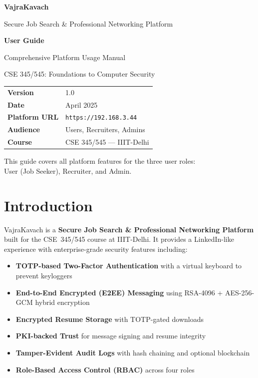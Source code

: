 \documentclass[12pt,a4paper]{article}
\begin{document}
\begin{titlepage}
\centering
\vspace*{2cm}
{\Huge\bfseries\color{primary} VajraKavach\par}
\vspace{0.5cm}
{\Large Secure Job Search \& Professional Networking Platform\par}
\vspace{2cm}
{\LARGE\bfseries User Guide\par}
\vspace{0.3cm}
{\large Comprehensive Platform Usage Manual\par}
\vspace{0.3cm}
{\large CSE 345/545: Foundations to Computer Security\par}
\vspace{2cm}

\begin{tabular}{ll}
\toprule
\textbf{Version} & 1.0 \\
\textbf{Date} & April 2025 \\
\textbf{Platform URL} & \texttt{https://192.168.3.44} \\
\textbf{Audience} & Users, Recruiters, Admins \\
\textbf{Course} & CSE 345/545 --- IIIT-Delhi \\
\bottomrule
\end{tabular}

\vfill
{\small This guide covers all platform features for the three user roles:\\User (Job Seeker), Recruiter, and Admin.}
\end{titlepage}

\newpage
\tableofcontents
\newpage

\section{Introduction}

VajraKavach is a \textbf{Secure Job Search \& Professional Networking Platform} built for the CSE~345/545 course at IIIT-Delhi. It provides a LinkedIn-like experience with enterprise-grade security features including:

\begin{itemize}[leftmargin=*]
  \item \textbf{TOTP-based Two-Factor Authentication} with a virtual keyboard to prevent keyloggers
  \item \textbf{End-to-End Encrypted (E2EE) Messaging} using RSA-4096 + AES-256-GCM hybrid encryption
  \item \textbf{Encrypted Resume Storage} with TOTP-gated downloads
  \item \textbf{PKI-backed Trust} for message signing and resume integrity
  \item \textbf{Tamper-Evident Audit Logs} with hash chaining and optional blockchain
  \item \textbf{Role-Based Access Control (RBAC)} across four roles
\end{itemize}
\end{document}
